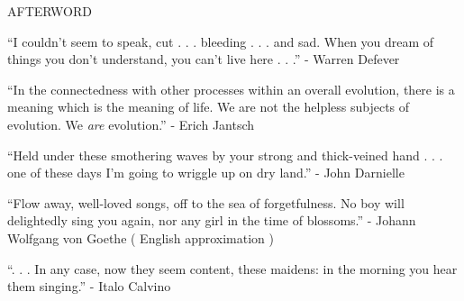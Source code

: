 \documentclass[11pt]{article}
\begin{document}
\begingroup
\begin{center}
\huge AFTERWORD
\end{center}
\endgroup

\vspace*{2\baselineskip}

\begingroup
\begin{center}
``I couldn't seem to speak, cut . . . bleeding . . . and sad. When you dream of things you don't understand, you can't live here . . .''
\rightskip\leftskip
\phantom{text} \hfill - Warren Defever
\end{center}
\endgroup

\vspace*{4\baselineskip}

\begingroup
\begin{center}
``In the connectedness with other processes within an overall evolution, there is a meaning which is the meaning of life. We are not the helpless subjects of evolution. We  \textit{are} evolution.'' 
\rightskip\leftskip
\phantom{text} \hfill - Erich Jantsch
\end{center}
\endgroup

\vspace*{4\baselineskip}

\begingroup
\begin{center}
``Held under these smothering waves by your strong and thick-veined hand . . . one of these days I'm going to wriggle up on dry land.''
\rightskip\leftskip
\phantom{text} \hfill - John Darnielle
\end{center}
\endgroup

\vspace*{4\baselineskip}

\begingroup
\begin{center}
``Flow away, well-loved songs, off to the sea of forgetfulness. No boy will delightedly sing you again, nor any girl in the time of blossoms.''
\rightskip\leftskip
\phantom{text} \hfill - Johann Wolfgang von Goethe ( English approximation )
\end{center}
\endgroup

\vspace*{4\baselineskip}

\begingroup
\begin{center}
``. . . In any case, now they seem content, these maidens: in the morning you hear them singing.''
\rightskip\leftskip
\phantom{text} \hfill - Italo Calvino
\end{center}
\endgroup
\end{document}
